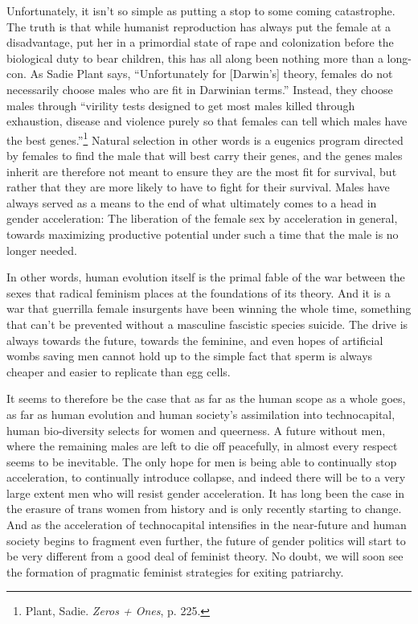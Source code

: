 \documentclass[10pt, statementpaper, twoside, openright]{memoir}
\begin{document}
Unfortunately, it isn't so simple as putting a stop to some coming catastrophe. The truth is that while humanist reproduction has always put the female at a disadvantage, put her in a primordial state of rape and colonization before the biological duty to bear children, this has all along been nothing more than a long-con. As Sadie Plant says, ``Unfortunately for [Darwin's] theory, females do not necessarily choose males who are fit in Darwinian terms.'' Instead, they choose males through ``virility tests designed to get most males killed through exhaustion, disease and violence purely so that females can tell which males have the best genes.''\footnote{Plant, Sadie. \textit{Zeros + Ones}, p. 225.} Natural selection in other words is a eugenics program directed by females to find the male that will best carry their genes, and the genes males inherit are therefore not meant to ensure they are the most fit for survival, but rather that they are more likely to have to fight for their survival. Males have always served as a means to the end of what ultimately comes to a head in gender acceleration: The liberation of the female sex by acceleration in general, towards maximizing productive potential under such a time that the male is no longer needed.

In other words, human evolution itself is the primal fable of the war between the sexes that radical feminism places at the foundations of its theory. And it is a war that guerrilla female insurgents have been winning the whole time, something that can't be prevented without a masculine fascistic species suicide. The drive is always towards the future, towards the feminine, and even hopes of artificial wombs saving men cannot hold up to the simple fact that sperm is always cheaper and easier to replicate than egg cells.

It seems to therefore be the case that as far as the human scope as a whole goes, as far as human evolution and human society's assimilation into technocapital, human bio-diversity selects for women and queerness. A future without men, where the remaining males are left to die off peacefully, in almost every respect seems to be inevitable. The only hope for men is being able to continually stop acceleration, to continually introduce collapse, and indeed there will be to a very large extent men who will resist gender acceleration. It has long been the case in the erasure of trans women from history and is only recently starting to change. And as the acceleration of technocapital intensifies in the near-future and human society begins to fragment even further, the future of gender politics will start to be very different from a good deal of feminist theory. No doubt, we will soon see the formation of pragmatic feminist strategies for exiting patriarchy.
\end{document}
